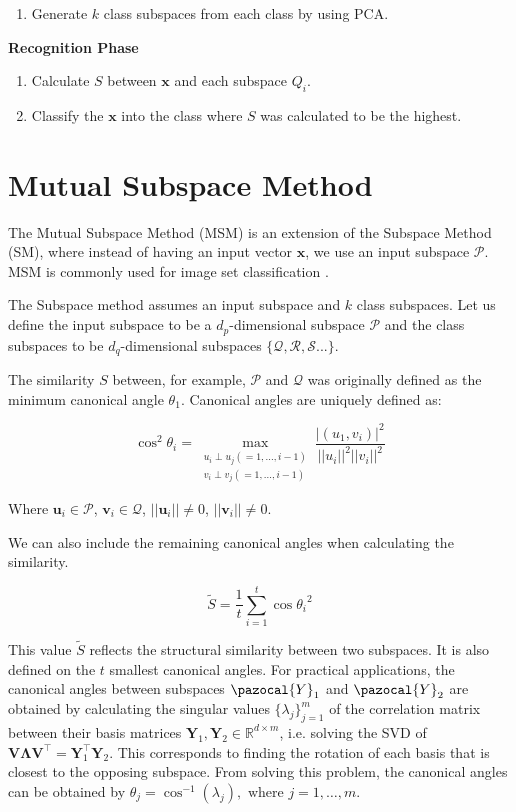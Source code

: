 \begin{enumerate}
    \item Generate $k$ class subspaces from each class by using PCA.
\end{enumerate}

\textbf{Recognition Phase}

\begin{enumerate}
    \item Calculate $S$ between $\mathbf{x}$ and each subspace $Q_i$. 
    \item Classify the $\mathbf{x}$ into the class where $S$ was calculated to be the highest.
\end{enumerate}

\section{Mutual Subspace Method}

The Mutual Subspace Method (MSM) is an extension of the Subspace Method (SM), where instead of having an input vector $\mathbf{x}$, we use an input subspace $\mathcal{P}$. MSM is commonly used for image set classification \cite{sakai2019gait}.

The Subspace method assumes an input subspace and $k$ class subspaces. Let us define the input subspace to be a $d_p$-dimensional subspace $\mathcal{P}$ and the class subspaces to be $d_q$-dimensional subspaces $\{\mathcal{Q}, \mathcal{R}, \mathcal{S}...\}$.

The similarity $S$ between, for example, $\mathcal{P}$ and $\mathcal{Q}$ was originally defined as the minimum canonical angle $\theta_1$. Canonical angles \cite{chatelin2012eigenvalues} are uniquely defined as:

\[    \cos^2 \theta_i = \max_{\substack{u_i \perp u_j(=1,...,i−1) \\ v_i \perp v_j(=1,...,i−1)}} \frac{|(u_1,v_i)|^2}{||u_i||^2||v_i||^2}\]

Where $\mathbf{u}_i \in \mathcal{P}$, $\mathbf{v}_i \in \mathcal{Q}$, $||\mathbf{u}_i|| \neq 0$, $||\mathbf{v}_i|| \neq 0$.

We can also include the remaining canonical angles when calculating the similarity. 

\[    \tilde{S} = \frac{1}{t} \sum^{t}_{i=1}\cos{\theta_i}^2 \]

This value $\tilde{S}$ reflects the structural similarity between two subspaces. It is also defined on the $t$ smallest canonical angles. For practical applications, the canonical angles between subspaces $\pazocal{Y}_1$ and $\pazocal{Y}_2$ are obtained by calculating the singular values $\{\lambda_j\}_{j=1}^{m}$ of the correlation matrix between their basis matrices $\bm{Y}_1, \bm{Y}_2 \in \mathbb{R}^{d{\times}m}$, i.e. solving the SVD of $\bm{V}\bm{\Lambda}\bm{V}^{\top} = \bm{Y}_1^{\top}\bm{Y}_2$. This corresponds to finding the rotation of each basis that is closest to the opposing subspace. From solving this problem, the canonical angles can be obtained by $\theta_j = \cos^{-1}(\lambda_j), \text{ where } j = 1, \ldots, m$.

